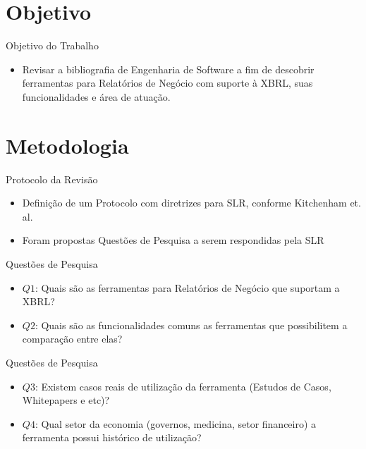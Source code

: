 \documentclass[t,14pt,mathserif]{beamer}
\begin{document}
\section{Objetivo}
\begin{frame}{Objetivo do Trabalho}
    \begin{itemize}
      \item Revisar a bibliografia de Engenharia de Software a fim de descobrir
        ferramentas para Relatórios de Negócio com suporte à XBRL, suas
        funcionalidades e área de atuação.
  \end{itemize}
\end{frame}

\section{Metodologia}
\begin{frame}{Protocolo da Revisão}
    \begin{itemize}
      \item Definição de um Protocolo com diretrizes para SLR, conforme
        Kitchenham et. al. \cite{kitchenham2009systematic}
      \item Foram propostas Questões de Pesquisa a serem respondidas pela SLR
  \end{itemize}
\end{frame}
\begin{frame}{Questões de Pesquisa}
    \begin{itemize}
     \item \textbf{$Q1$}: Quais são as ferramentas para Relatórios de Negócio que
    suportam a XBRL?
  \item \textbf{$Q2$}: Quais são as funcionalidades comuns as ferramentas
    que possibilitem a comparação entre elas?
    \end{itemize}
\end{frame}
\begin{frame}{Questões de Pesquisa}
    \begin{itemize}
        \item \textbf{$Q3$}: Existem casos reais de utilização da ferramenta
    (Estudos de Casos, Whitepapers e etc)?
      \item \textbf{$Q4$}: Qual setor da economia (governos, medicina, setor financeiro) a ferramenta possui histórico de utilização?
    \end{itemize}
\end{frame}
\end{document}
